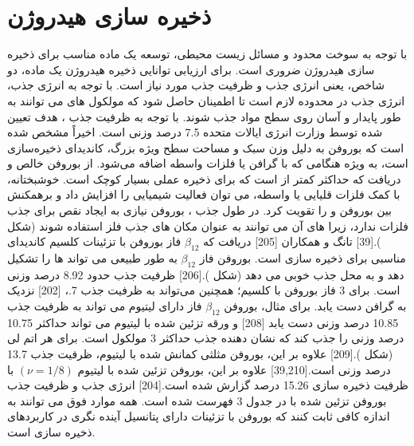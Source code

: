 \section{ذخیره سازی هیدروژن}
با توجه به سوخت محدود و مسائل زیست محیطی، توسعه یک ماده مناسب برای ذخیره سازی هیدروژن ضروری است. برای ارزیابی توانایی ذخیره هیدروژن یک ماده، دو شاخص، یعنی انرژی جذب و ظرفیت جذب  مورد نیاز است. با توجه به انرژی جذب، انرژی جذب در محدوده  لازم است تا اطمینان حاصل شود که مولکول های  می توانند به طور پایدار و آسان روی سطح مواد جذب شوند. با توجه به ظرفیت جذب ، هدف تعیین شده توسط وزارت انرژی ایالات متحده 7.5 درصد وزنی است. اخیراً مشخص شده است که بوروفن به دلیل وزن سبک و مساحت سطح ویژه بزرگ، کاندیدای ذخیره‌سازی  است، به ویژه هنگامی که با گرافن یا فلزات واسطه اضافه می‌شود. از بوروفن خالص و دریافت که حداکثر کمتر از  است که برای ذخیره عملی  بسیار کوچک است. خوشبختانه، با کمک فلزات قلیایی یا واسطه، می توان فعالیت شیمیایی را افزایش داد و برهمکنش بین بوروفن و  را تقویت کرد. در طول جذب ، بوروفن نیازی به ایجاد نقص برای جذب فلزات ندارد، زیرا  های آن می توانند به عنوان مکان های جذب فلز استفاده شوند (شکل ).\cite{shangTwoDimensionalBoron2018}[39] تانگ و همکاران \cite{tangTheoreticalInvestigationCalcium2018}[205] دریافت که $\beta_{12}$ فاز بوروفن با تزئینات کلسیم کاندیدای مناسبی برای ذخیره سازی  است. بوروفن فاز $\beta_{12}$ به طور طبیعی می تواند  ها را تشکیل دهد و به  محل جذب خوبی می دهد (شکل ).[206] ظرفیت جذب  حدود 8.92 درصد وزنی است. برای 3 فاز بوروفن با کلسیم؛ همچنین می‌تواند به ظرفیت جذب  7.، [202] نزدیک به گرافن دست یابد. برای مثال، بوروفن $\beta_{12}$ فاز دارای لیتیوم می تواند به ظرفیت جذب  10.85 درصد وزنی دست یابد \cite{liuLiDecorated12BorophenePotential2017}[208] و ورقه تزئین شده با لیتیوم می تواند حداکثر 10.75 درصد وزنی  را جذب کند که نشان دهنده جذب حداکثر 3 مولکول  است. برای هر اتم لی (شکل ).\cite{erDFTStudyPlanar2009}[209] علاوه بر این، بوروفن مثلثی کمانش شده با لیتیوم، ظرفیت جذب  13.7 درصد وزنی است.\cite{shangTwoDimensionalBoron2018, liHighHydrogenStorage2017}[39,210] علاوه بر این، بوروفن تزئین شده با لیتیوم $(\nu= 1/8)$ با ظرفیت ذخیره سازی  15.26 درصد گزارش شده است.\cite{liUltrahighCapacityMolecularHydrogen2015}[204] انرژی جذب و ظرفیت جذب  بوروفن تزئین شده با  در جدول 3 فهرست شده است. همه موارد فوق می توانند به اندازه کافی ثابت کنند که بوروفن با تزئینات  دارای پتانسیل آینده نگری در کاربردهای ذخیره سازی  است.

